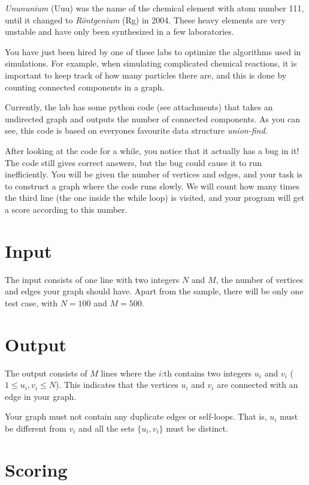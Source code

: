 
\emph{Unununium} (Uuu) was the name of the chemical element with atom number 111, until it changed to
\emph{Röntgenium} (Rg) in 2004. These heavy elements are very unstable and have only been synthesized
in a few laboratories.

You have just been hired by one of these labs to optimize the algorithms used in simulations.
For example, when simulating complicated chemical reactions, it is important to keep track of 
how many particles there are, and this is done by counting connected components in a graph.

Currently, the lab has some python code (see attachments) that takes an undirected graph and 
outputs the number of connected components. As you can see, this code is based on everyones 
favourite data structure \emph{union-find}.

After looking at the code for a while, you notice that it actually has a bug in it!  The code still 
gives correct answers, but the bug could cause it to run inefficiently.
You will be given the number of vertices and edges, and your task is to construct a graph where the 
code runs slowly. We will count how many times the third line (the one inside the while loop) is 
visited, and your program will get a score according to this number.

\section*{Input}

The input consists of one line with two integers $N$ and $M$, the number of vertices and edges
your graph should have. Apart from the sample, there will be only one test case, with $N = 100$
and $M = 500$.

\section*{Output}

The output consists of $M$ lines where the $i$:th contains two integers $u_i$ and $v_i$
($1 \leq u_i, v_i \leq N$). This indicates that the vertices $u_i$ and $v_i$ are connected
with an edge in your graph.

Your graph must not contain any duplicate edges or self-loops. That is, $u_i$ must be different
from $v_i$ and all the sets $\{u_i, v_i\}$ must be distinct.


\section*{Scoring}

